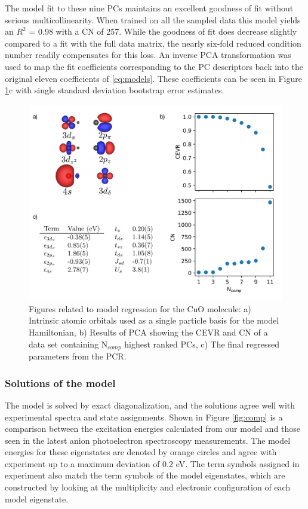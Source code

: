 \documentclass[12pt]{article}
\begin{document}
The model fit to these nine PCs maintains an excellent goodness of fit without serious multicollinearity.
When trained on all the sampled data this model yields an $R^2$ = 0.98 with a CN of 257. 
While the goodness of fit does decrease slightly compared to a fit with the full data matrix, the nearly six-fold reduced condition number readily compensates for this loss.
An inverse PCA transformation was used to map the fit coefficients corresponding to the PC descriptors back into the original eleven coefficients of \eqref{eq:models}.
These coefficients can be seen in Figure \ref{fig:cuo_regr}c with single standard deviation bootstrap error estimates.

\begin{figure}
\centering
\includegraphics[width=1.0\linewidth]{./figs/cuo_regr.pdf}
\caption{Figures related to model regression for the CuO molecule: a) Intrinsic atomic orbitals used as a single particle basis for the model Hamiltonian, b) Results of PCA showing the CEVR and CN of a data set containing N$_{comp}$  highest ranked PCs, c) The final regressed parameters from the PCR.}
\label{fig:cuo_regr}
\end{figure}

\subsubsection{Solutions of the model}
The model is solved by exact diagonalization, and the solutions agree well with experimental spectra and state assignments.
Shown in Figure \ref{fig:comp} is a comparison between the excitation energies calculated from our model and those seen in the latest anion photoelectron spectroscopy measurements.
The model energies for these eigenstates are denoted by orange circles and agree with experiment up to a maximum deviation of 0.2 eV.
The term symbols assigned in experiment also match the term symbols of the model eigenstates, which are constructed by looking at the multiplicity and electronic configuration of each model eigenstate. 
\end{document}
